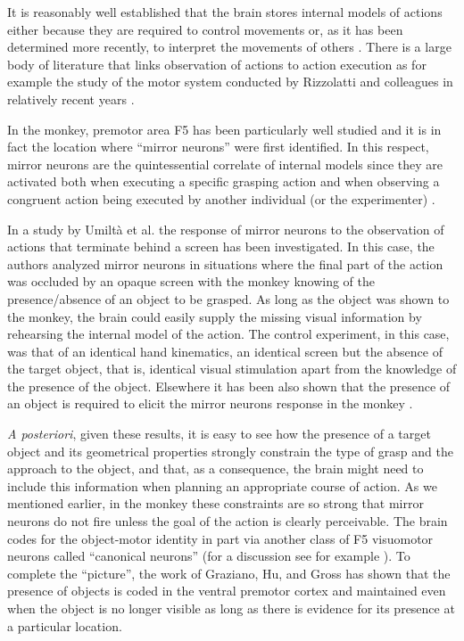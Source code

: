It is reasonably well established that the brain stores internal
models of actions either because they are required to control
movements or, as it has been determined more recently, to interpret
the movements of others \cite{kawato-99, wolpert-03, mussaivaldi-00,
lackner-98}.  There is a large body of literature that links
observation of actions to action execution as for example the study of
the motor system conducted by Rizzolatti and colleagues in relatively
recent years \cite{rizzolatti-04,gallese-96,rizzolatti-01}.

In the monkey, premotor area F5 has been particularly well studied and
it is in fact the location where ``mirror neurons'' were first
identified. In this respect, mirror neurons are the quintessential
correlate of internal models since they are activated both when
executing a specific grasping action and when observing a congruent
action being executed by another individual (or the experimenter)
\cite{fadiga-00}.

In a study by Umilt\`a et al. \cite{umilta-01} the response of mirror
neurons to the observation of actions that terminate behind a screen
has been investigated. In this case, the authors analyzed mirror
neurons in situations where the final part of the action was occluded
by an opaque screen with the monkey knowing of the presence/absence of
an object to be grasped. As long as the object was shown to the
monkey, the brain could easily supply the missing visual information
by rehearsing the internal model of the action. The control
experiment, in this case, was that of an identical hand kinematics, an
identical screen but the absence of the target object, that is,
identical visual stimulation apart from the knowledge of the presence
of the object. Elsewhere it has been also shown that the presence of
an object is required to elicit the mirror neurons response in the
monkey \cite{gallese-96}.

{\em A posteriori}, given these results, it is easy to see how the
presence of a target object and its geometrical properties strongly
constrain the type of grasp and the approach to the object, and that,
as a consequence, the brain might need to include this information
when planning an appropriate course of action.  As we mentioned
earlier, in the monkey these constraints are so strong that mirror
neurons do not fire unless the goal of the action is clearly
perceivable. The brain codes for the object-motor identity in part via
another class of F5 visuomotor neurons called ``canonical neurons''
(for a discussion see for example \cite{metta-06}).  To complete the
``picture'', the work of Graziano, Hu, and Gross \cite{graziano-97}
has shown that the presence of objects is coded in the ventral
premotor cortex and maintained even when the object is no longer
visible as long as there is evidence for its presence at a particular
location.

